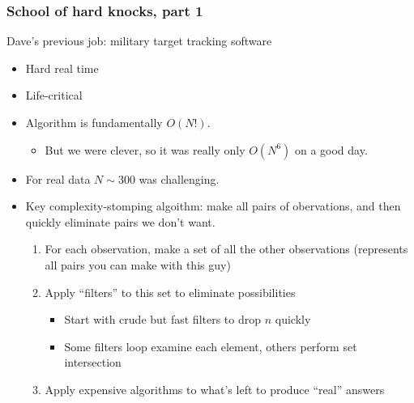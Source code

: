 \begin{frame}[fragile]
\frametitle{School of hard knocks, part 1}

Dave's previous job: military target tracking software

\begin{itemize}[<+->]
\item Hard real time
\item Life-critical
\item Algorithm is fundamentally $O(N!)$.
\begin{itemize}
  \item But we were clever, so it was really only $O(N^6)$ on a good
    day.
\end{itemize}
\item For real data $N \sim 300$ was challenging.
\end{itemize}

\vskip 12pt
\pause
\begin{itemize}[<+->]
\item Key complexity-stomping algoithm:  make all pairs of
  obervations, and then quickly eliminate pairs we don't want.
  \begin{enumerate}
  \item For each observation, make a set of all the other observations
    (represents all pairs you can make with this guy)
  \item Apply ``filters'' to this set to eliminate possibilities
    \begin{itemize}
      \item Start with crude but fast filters to drop $n$ quickly
      \item Some filters loop examine each element, others perform set
        intersection
    \end{itemize}
  \item Apply expensive algorithms to what's left to produce ``real''
    answers
  \end{enumerate}
\end{itemize}
\end{frame}

